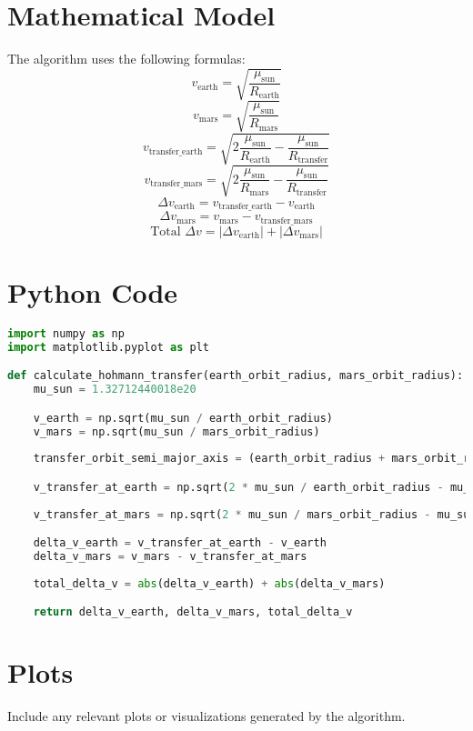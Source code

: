\documentclass{report}
\begin{document}
\section{Mathematical Model}
The algorithm uses the following formulas:
\begin{equation}
v_{\text{earth}} = \sqrt{\frac{\mu_{\text{sun}}}{R_{\text{earth}}}}
\end{equation}
\begin{equation}
v_{\text{mars}} = \sqrt{\frac{\mu_{\text{sun}}}{R_{\text{mars}}}}
\end{equation}
\begin{equation}
v_{\text{transfer\_earth}} = \sqrt{2\frac{\mu_{\text{sun}}}{R_{\text{earth}}} - \frac{\mu_{\text{sun}}}{R_{\text{transfer}}}}
\end{equation}
\begin{equation}
v_{\text{transfer\_mars}} = \sqrt{2\frac{\mu_{\text{sun}}}{R_{\text{mars}}} - \frac{\mu_{\text{sun}}}{R_{\text{transfer}}}}
\end{equation}
\begin{equation}
\Delta v_{\text{earth}} = v_{\text{transfer\_earth}} - v_{\text{earth}}
\end{equation}
\begin{equation}
\Delta v_{\text{mars}} = v_{\text{mars}} - v_{\text{transfer\_mars}}
\end{equation}
\begin{equation}
\text{Total } \Delta v = |\Delta v_{\text{earth}}| + |\Delta v_{\text{mars}}|
\end{equation}

\section{Python Code}
\begin{lstlisting}[language=Python]
import numpy as np
import matplotlib.pyplot as plt

def calculate_hohmann_transfer(earth_orbit_radius, mars_orbit_radius):
    mu_sun = 1.32712440018e20

    v_earth = np.sqrt(mu_sun / earth_orbit_radius)
    v_mars = np.sqrt(mu_sun / mars_orbit_radius)
    
    transfer_orbit_semi_major_axis = (earth_orbit_radius + mars_orbit_radius) / 2

    v_transfer_at_earth = np.sqrt(2 * mu_sun / earth_orbit_radius - mu_sun / transfer_orbit_semi_major_axis)
    
    v_transfer_at_mars = np.sqrt(2 * mu_sun / mars_orbit_radius - mu_sun / transfer_orbit_semi_major_axis)

    delta_v_earth = v_transfer_at_earth - v_earth
    delta_v_mars = v_mars - v_transfer_at_mars
    
    total_delta_v = abs(delta_v_earth) + abs(delta_v_mars)

    return delta_v_earth, delta_v_mars, total_delta_v
\end{lstlisting}

\section{Plots}
Include any relevant plots or visualizations generated by the algorithm.
\end{document}
